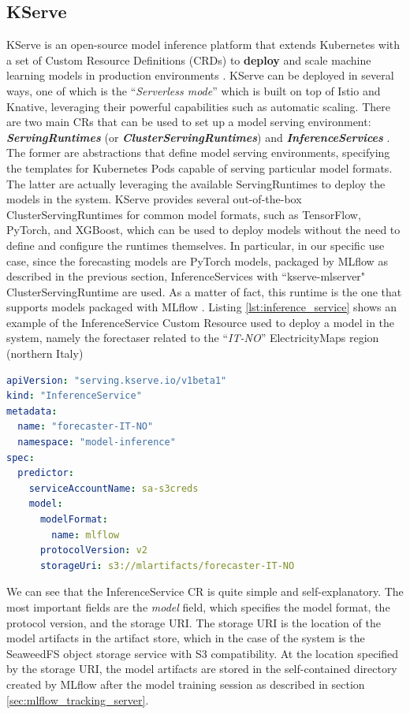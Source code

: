 \subsection{KServe}
\label{sec:kserve}

KServe is an open-source model inference platform that extends Kubernetes with a set of Custom Resource Definitions (CRDs) to \textbf{deploy} and scale machine learning models in production environments \cite{kserve_docs}.
KServe can be deployed in several ways, one of which is the ``\textit{Serverless mode}'' which is built on top of Istio and Knative, leveraging their powerful capabilities such as automatic scaling. 
There are two main CRs that can be used to set up a model serving environment: \textit{\textbf{ServingRuntimes}} (or \textit{\textbf{ClusterServingRuntimes}}) and \textit{\textbf{InferenceServices}} \cite{krateo_docs}.
The former are abstractions that define model serving environments, specifying the templates for Kubernetes Pods capable of serving particular model formats. 
The latter are actually leveraging the available ServingRuntimes to deploy the models in the system.  
KServe provides several out-of-the-box ClusterServingRuntimes for common model formats, such as TensorFlow, PyTorch, and XGBoost, which can be used to deploy models without the need to define and configure the runtimes themselves.
In particular, in our specific use case, since the forecasting models are PyTorch models, packaged by MLflow as described in the previous section, InferenceServices with ``kserve-mlserver" ClusterServingRuntime are used. 
As a matter of fact, this runtime is the one that supports models packaged with MLflow \cite{kserve_mlflow}.
Listing \ref{lst:inference_service} shows an example of the InferenceService Custom Resource used to deploy a model in the system, namely the forectaser related to the ``\textit{IT-NO}'' ElectricityMaps region (northern Italy) \\

\begin{lstlisting}[language=yaml, caption={InferenceService Custom Resource example}, label={lst:inference_service}]
apiVersion: "serving.kserve.io/v1beta1"
kind: "InferenceService"
metadata:
  name: "forecaster-IT-NO"
  namespace: "model-inference"
spec:
  predictor:
    serviceAccountName: sa-s3creds
    model:
      modelFormat:
        name: mlflow
      protocolVersion: v2  
      storageUri: s3://mlartifacts/forecaster-IT-NO
\end{lstlisting}

We can see that the InferenceService CR is quite simple and self-explanatory. 
The most important fields are the \textit{model} field, which specifies the model format, the protocol version, and the storage URI.
The storage URI is the location of the model artifacts in the artifact store, which in the case of the system is the SeaweedFS object storage service with S3 compatibility. 
At the location specified by the storage URI, the model artifacts are stored in the self-contained directory created by MLflow after the model training session as described in section \ref{sec:mlflow_tracking_server}.

